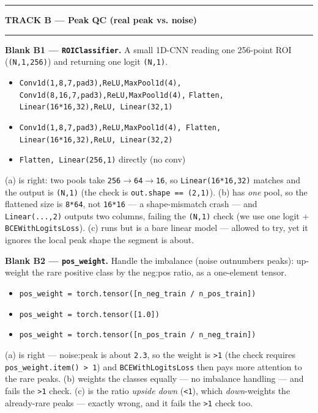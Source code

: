 \documentclass[11pt]{article}
\newcommand{\opt}[1]{\texttt{#1}}
\begin{document}
\vspace{3pt}\hrule
\begin{center}\textbf{TRACK B --- Peak QC (real peak vs. noise)}\end{center}\hrule\vspace{4pt}

\textbf{Blank B1 --- \opt{ROIClassifier}.}\; {\small A small 1D-CNN reading one 256-point ROI
(\opt{(N,1,256)}) and returning one logit \opt{(N,1)}.}
\begin{itemize}
  \item[(a)] \opt{Conv1d(1,8,7,pad3),ReLU,MaxPool1d(4), Conv1d(8,16,7,pad3),ReLU,MaxPool1d(4),}
    \opt{Flatten, Linear(16*16,32),ReLU, Linear(32,1)}
  \item[(b)] \opt{Conv1d(1,8,7,pad3),ReLU,MaxPool1d(4), Flatten, Linear(16*16,32),ReLU, Linear(32,2)}
  \item[(c)] \opt{Flatten, Linear(256,1)} directly (no conv)
\end{itemize}
{\small (a) is right: two pools take \opt{256$\to$64$\to$16}, so \opt{Linear(16*16,32)} matches and the
output is \opt{(N,1)} (the check is \opt{out.shape == (2,1)}). (b) has \emph{one} pool, so the flattened
size is \opt{8*64}, not \opt{16*16} --- a shape-mismatch crash --- and \opt{Linear(...,2)} outputs two
columns, failing the \opt{(N,1)} check (we use one logit + \opt{BCEWithLogitsLoss}). (c) runs but is a bare
linear model --- allowed to try, yet it ignores the local peak shape the segment is about.}

\vspace{3pt}
\textbf{Blank B2 --- \opt{pos\_weight}.}\; {\small Handle the imbalance (noise outnumbers peaks): up-weight
the rare positive class by the neg:pos ratio, as a one-element tensor.}
\begin{itemize}
  \item[(a)] \opt{pos\_weight = torch.tensor([n\_neg\_train / n\_pos\_train])}
  \item[(b)] \opt{pos\_weight = torch.tensor([1.0])}
  \item[(c)] \opt{pos\_weight = torch.tensor([n\_pos\_train / n\_neg\_train])}
\end{itemize}
{\small (a) is right --- noise:peak is about \opt{2.3}, so the weight is \opt{>1} (the check requires
\opt{pos\_weight.item() > 1}) and \opt{BCEWithLogitsLoss} then pays more attention to the rare peaks. (b)
weights the classes equally --- no imbalance handling --- and fails the \opt{>1} check. (c) is the ratio
\emph{upside down} (\opt{<1}), which \emph{down}-weights the already-rare peaks --- exactly wrong, and it
fails the \opt{>1} check too.}
\end{document}
